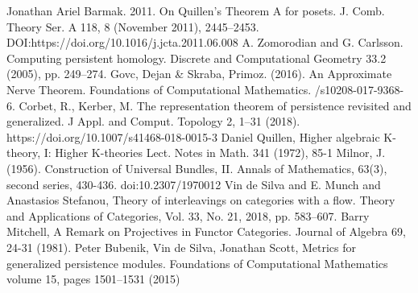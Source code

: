 \documentclass[english,12pt]{article}
\numberwithin{equation}{section}
\theoremstyle{definition}
\theoremstyle{remark}
\begin{document}
\begin{thebibliography}{99}
  Jonathan Ariel Barmak. 2011.
  \newblock On Quillen’s Theorem A for posets.
  \newblock J. Comb. Theory Ser. A 118, 8 (November 2011), 2445–2453.
  \newblock DOI:https://doi.org/10.1016/j.jcta.2011.06.008
  A. Zomorodian and G. Carlsson.
  \newblock Computing persistent homology.
  \newblock Discrete and Computational Geometry 33.2 (2005), pp. 249–274.
  Govc, Dejan \& Skraba, Primoz. (2016).
  \newblock An Approximate Nerve Theorem.
  \newblock Foundations of Computational Mathematics.
  /s10208-017-9368-6.
  Corbet, R., Kerber, M.
  \newblock The representation theorem of persistence revisited and generalized.
  \newblock J Appl. and Comput. Topology 2, 1–31 (2018).
  \newblock https://doi.org/10.1007/s41468-018-0015-3
  Daniel Quillen,
  \newblock Higher algebraic K-theory, I: Higher K-theories Lect.
  \newblock Notes in Math. 341 (1972), 85-1
  Milnor, J. (1956).
  \newblock Construction of Universal Bundles, II.
  \newblock Annals of Mathematics, 63(3), second series, 430-436.
  \newblock doi:10.2307/1970012
  Vin de Silva and E. Munch and Anastasios Stefanou,
  \newblock Theory of interleavings on categories with a flow.
  \newblock Theory and Applications of Categories, Vol. 33, No. 21, 2018, pp. 583–607.
  Barry Mitchell,
  \newblock A Remark on Projectives in Functor Categories.
  \newblock Journal of Algebra 69, 24-31 (1981).
  Peter Bubenik, Vin de Silva, Jonathan Scott,
  \newblock Metrics for generalized persistence modules.
  \newblock Foundations of Computational Mathematics volume 15, pages 1501–1531 (2015)
\end{thebibliography}
\end{document}

